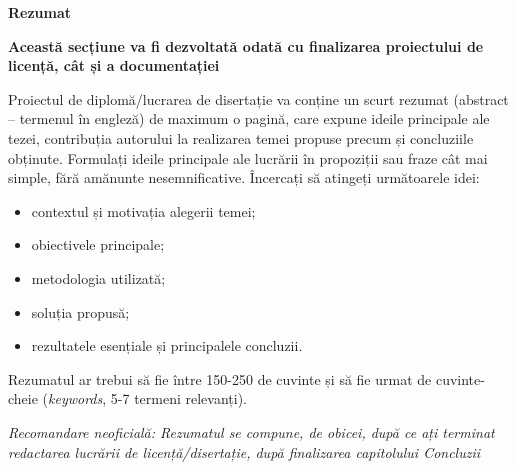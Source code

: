 \newpage
\begin{center}
    \LARGE
    \textbf{\thesistitle}
    
    \vspace{0.5cm}
    
    \authornamefl
    
    \vspace{1cm}
    
    \textbf{Rezumat}
    
    \vspace{1cm}
\end{center}

\textbf{Această secțiune va fi dezvoltată odată cu finalizarea proiectului de licență, cât și a documentației}

Proiectul de diplomă/lucrarea de disertație va conține un scurt rezumat (abstract – termenul în engleză) de maximum o pagină, care expune ideile principale ale tezei, contribuția autorului la realizarea temei propuse precum și concluziile obținute. Formulați ideile principale ale lucrării în propoziții sau fraze cât mai simple, fără amănunte nesemnificative. Încercați să atingeți următoarele idei:
\begin{itemize}
    \item contextul și motivația alegerii temei;
    \item obiectivele principale;
    \item metodologia utilizată;
    \item soluția propusă;
    \item rezultatele esențiale și principalele concluzii.
\end{itemize}

Rezumatul ar trebui să fie între 150-250 de cuvinte și să fie urmat de cuvinte-cheie (\textit{keywords}, 5-7 termeni relevanți).

\textit{Recomandare neoficială: Rezumatul se compune, de obicei, după ce ați terminat redactarea lucrării de licență/disertație, după finalizarea capitolului Concluzii}